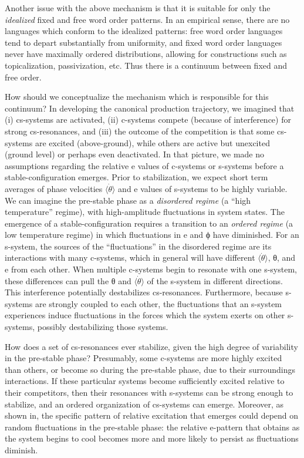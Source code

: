   Another issue with the above mechanism is that it is suitable for only the \textit{idealized} fixed and free word order patterns. In an empirical sense, there are no languages which conform to the idealized patterns: free word order languages tend to depart substantially from uniformity, and fixed word order languages never have maximally ordered distributions, allowing for constructions such as topicalization, passivization, etc. Thus there is a continuum between fixed and free order. 

  How should we conceptualize the mechanism which is responsible for this continuum? In developing the canonical production trajectory, we imagined that (i) cs-systems are activated, (ii) c-systems compete (because of interference) for strong cs-resonances, and (iii) the outcome of the competition is that some cs-systems are excited (above-ground), while others are active but unexcited (ground level) or perhaps even deactivated. In that picture, we made no assumptions regarding the relative e values of c-systems or s-systems before a stable-configuration emerges. Prior to stabilization, we expect short term averages of phase velocities $\langle\dot{\theta}\rangle$ and e values of s-systems to be highly variable. We can imagine the pre-stable phase as a \textit{disordered regime} (a “high temperature” regime), with high-amplitude fluctuations in system states. The emergence of a stable-configuration requires a transition to an \textit{ordered regime} (a low temperature regime) in which fluctuations in e and ϕ have diminished. For an s-system, the sources of the “fluctuations” in the disordered regime are its interactions with many c-systems, which in general will have different $\langle\dot{\theta}\rangle$, θ, and e from each other. When multiple c-systems begin to resonate with one s-system, these differences can pull the θ and $\langle\dot{\theta}\rangle$ of the s-system in different directions. This interference potentially destabilizes cs-resonances. Furthermore, because s-systems are strongly coupled to each other, the fluctuations that an s-system experiences induce fluctuations in the forces which the system exerts on other s-systems, possibly destabilizing those systems.

  How does a set of cs-resonances ever stabilize, given the high degree of variability in the pre-stable phase? Presumably, some c-systems are more highly excited than others, or become so during the pre-stable phase, due to their surroundings interactions. If these particular systems become sufficiently excited relative to their competitors, then their resonances with s-systems can be strong enough to stabilize, and an ordered organization of cs-systems can emerge. Moreover, as shown in{}, the specific pattern of relative excitation that emerges could depend on random fluctuations in the pre-stable phase: the relative e-pattern that obtains as the system begins to cool becomes more and more likely to persist as fluctuations diminish.

